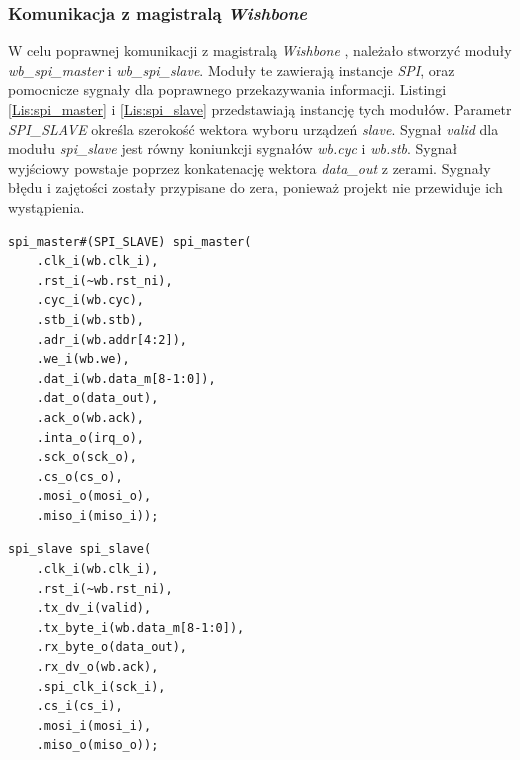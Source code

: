 \documentclass[11pt,a4paper]{article}
\begin{document}
		\subsubsection{Komunikacja z magistralą \textit{Wishbone}}
		\hspace{5mm} W celu poprawnej komunikacji z magistralą \textit{Wishbone} , należało stworzyć moduły \textit{wb\_spi\_master} i \textit{wb\_spi\_slave}. Moduły te zawierają instancje \textit{SPI}, oraz pomocnicze sygnały dla poprawnego przekazywania informacji. Listingi \ref{Lis:spi_master} i \ref{Lis:spi_slave} przedstawiają instancję tych modułów. Parametr \textit{SPI\_SLAVE} określa szerokość wektora wyboru urządzeń \textit{slave}. Sygnał \textit{valid} dla modułu \textit{spi\_slave} jest równy koniunkcji sygnałów \textit{wb.cyc} i \textit{wb.stb}. Sygnał wyjściowy powstaje poprzez konkatenację wektora \textit{data\_out} z zerami. Sygnały błędu i zajętości zostały przypisane do zera, ponieważ projekt nie przewiduje ich wystąpienia.\\
		\begin{minipage}{.49\textwidth}
\begin{scriptsize}
\begin{lstlisting}[label=Lis:spi_master,caption=Instancja pamięci instrukcji]
    spi_master#(SPI_SLAVE) spi_master(
    .clk_i(wb.clk_i),
    .rst_i(~wb.rst_ni),
    .cyc_i(wb.cyc),
    .stb_i(wb.stb),
    .adr_i(wb.addr[4:2]),
    .we_i(wb.we),
    .dat_i(wb.data_m[8-1:0]),
    .dat_o(data_out),
    .ack_o(wb.ack),
    .inta_o(irq_o),
    .sck_o(sck_o),
    .cs_o(cs_o),
    .mosi_o(mosi_o),
    .miso_i(miso_i));
\end{lstlisting}
\end{scriptsize}
\end{minipage} \hspace{.02\textwidth}
\begin{minipage}{.49\textwidth}
\begin{scriptsize}
\begin{lstlisting}[label=Lis:spi_slave,caption=Instancja pamięci danych]
    spi_slave spi_slave(
    .clk_i(wb.clk_i),
    .rst_i(~wb.rst_ni),
    .tx_dv_i(valid),
    .tx_byte_i(wb.data_m[8-1:0]),
    .rx_byte_o(data_out),
    .rx_dv_o(wb.ack),
    .spi_clk_i(sck_i),
    .cs_i(cs_i),
    .mosi_i(mosi_i),
    .miso_o(miso_o));
\end{lstlisting}
\end{scriptsize}
\end{minipage}\\
\end{document}
